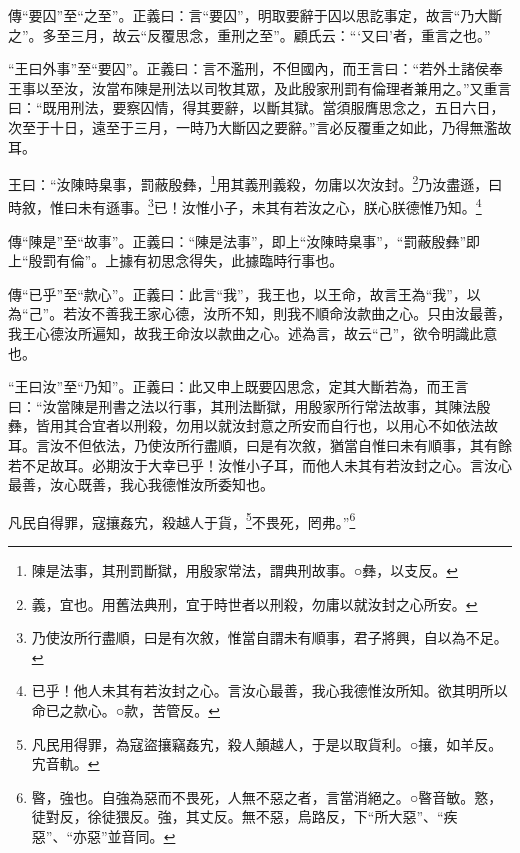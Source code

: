 {\noindent\zhuan{}\fzbyks 傳“要囚”至“之至”。正義曰：言“要囚”，明取要辭于囚以思訖事定，故言“乃大斷之”。多至三月，故云“反覆思念，重刑之至”。顧氏云：“‘又曰’者，重言之也。” \par}

{\noindent\shu{}\fzkt “王曰外事”至“要囚”。正義曰：言不濫刑，不但國內，而王言曰：“若外土諸侯奉王事以至汝，汝當布陳是刑法以司牧其眾，及此殷家刑罰有倫理者兼用之。”又重言曰：“既用刑法，要察囚情，得其要辭，以斷其獄。當須服膺思念之，五日六日，次至于十日，遠至于三月，一時乃大斷囚之要辭。”言必反覆重之如此，乃得無濫故耳。 \par}

王曰：“汝陳時臬事，罰蔽殷彝，\footnote{陳是法事，其刑罰斷獄，用殷家常法，謂典刑故事。○彝，以支反。}用其義刑義殺，勿庸以次汝封。\footnote{義，宜也。用舊法典刑，宜于時世者以刑殺，勿庸以就汝封之心所安。}乃汝盡遜，曰時敘，惟曰未有遜事。\footnote{乃使汝所行盡順，曰是有次敘，惟當自謂未有順事，君子將興，自以為不足。}已！汝惟小子，未其有若汝之心，朕心朕德惟乃知。\footnote{已乎！他人未其有若汝封之心。言汝心最善，我心我德惟汝所知。欲其明所以命已之款心。○款，苦管反。}


{\noindent\zhuan{}\fzbyks 傳“陳是”至“故事”。正義曰：“陳是法事”，即上“汝陳時臬事”，“罰蔽殷彝”即上“殷罰有倫”。上據有初思念得失，此據臨時行事也。 \par}

{\noindent\zhuan{}\fzbyks 傳“已乎”至“款心”。正義曰：此言“我”，我王也，以王命，故言王為“我”，以為“己”。若汝不善我王家心德，汝所不知，則我不順命汝款曲之心。只由汝最善，我王心德汝所遍知，故我王命汝以款曲之心。述為言，故云“己”，欲令明識此意也。 \par}

{\noindent\shu{}\fzkt “王曰汝”至“乃知”。正義曰：此又申上既要囚思念，定其大斷若為，而王言曰：“汝當陳是刑書之法以行事，其刑法斷獄，用殷家所行常法故事，其陳法殷彝，皆用其合宜者以刑殺，勿用以就汝封意之所安而自行也，以用心不如依法故耳。言汝不但依法，乃使汝所行盡順，曰是有次敘，猶當自惟曰未有順事，其有餘若不足故耳。必期汝于大幸已乎！汝惟小子耳，而他人未其有若汝封之心。言汝心最善，汝心既善，我心我德惟汝所委知也。 \par}

凡民自得罪，寇攘姦宄，殺越人于貨，\footnote{凡民用得罪，為寇盜攘竊姦宄，殺人顛越人，于是以取貨利。○攘，如羊反。宄音軌。}不畏死，罔弗。”\footnote{暋，強也。自強為惡而不畏死，人無不惡之者，言當消絕之。○暋音敏。憝，徒對反，徐徒猥反。強，其丈反。無不惡，烏路反，下“所大惡”、“疾惡”、“亦惡”並音同。}


